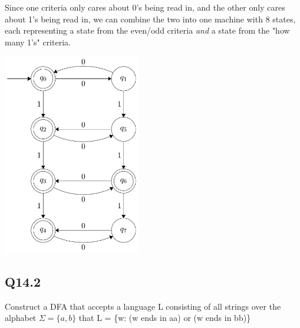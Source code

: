 \documentclass{article}
\begin{document}
Since one criteria only cares about 0's being read in, and the other only cares about 1's being read in, we can combine the two into one machine with 8 states, each representing a state from the even/odd criteria \textit{and} a state from the "how many 1's" criteria.
\begin{center}
    \includegraphics[width=6cm]{Screenshot 2023-11-21 143618.png}
\end{center}
\newpage

\subsection*{Q14.2}
Construct a DFA that accepts a language L consisting of all strings over the alphabet \(\Sigma=\{a, b\}\) that L = \{w: (w ends in aa) or (w ends in bb)\}
\newpage
\end{document}
